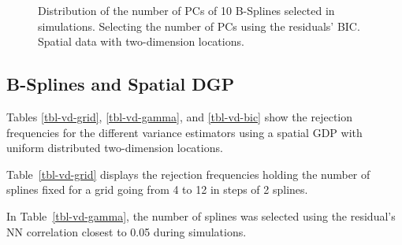 \documentclass[
]{article}
\begin{document}
\begin{figure}

\begin{minipage}[t]{0.50\linewidth}

{\centering 


}

\end{minipage}%
%
\begin{minipage}[t]{0.50\linewidth}

{\centering 


}

\end{minipage}%

\caption{\label{fig-pc-bic-vd-spa}Distribution of the number of PCs of
10 B-Splines selected in simulations. Selecting the number of PCs using
the residuals' BIC. Spatial data with two-dimension locations.}

\end{figure}

\hypertarget{b-splines-and-spatial-dgp}{%
\subsection{B-Splines and Spatial DGP}\label{b-splines-and-spatial-dgp}}

Tables \ref{tbl-vd-grid}, \ref{tbl-vd-gamma}, and \ref{tbl-vd-bic} show
the rejection frequencies for the different variance estimators using a
spatial GDP with uniform distributed two-dimension locations.

Table~\ref{tbl-vd-grid} displays the rejection frequencies holding the
number of splines fixed for a grid going from 4 to 12 in steps of 2
splines.

In Table~\ref{tbl-vd-gamma}, the number of splines was selected using
the residual's NN correlation closest to 0.05 during simulations.
\end{document}
